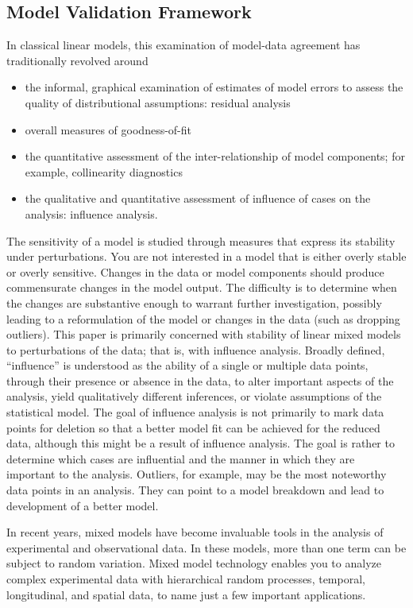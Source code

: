 \documentclass[Main.tex]{subfiles}
\begin{document}
	\subsection*{Model Validation Framework}
	In classical linear models, this examination of model-data agreement has traditionally revolved around
	\begin{itemize}
	\item the informal, graphical examination of estimates of model errors to assess the quality of distributional
	assumptions: residual analysis
	
	\item  overall measures of goodness-of-fit
	\item the quantitative assessment of the inter-relationship of model components; for example, collinearity
	diagnostics
	\item the qualitative and quantitative assessment of influence of cases on the analysis: influence analysis.
\end{itemize}
	The sensitivity of a model is studied through measures that express its stability under perturbations. You
	are not interested in a model that is either overly stable or overly sensitive. Changes in the data or model
	components should produce commensurate changes in the model output. The difficulty is to determine
	when the changes are substantive enough to warrant further investigation, possibly leading to a reformulation
	of the model or changes in the data (such as dropping outliers). This paper is primarily concerned
	with stability of linear mixed models to perturbations of the data; that is, with influence analysis. Broadly
	defined, “influence” is understood as the ability of a single or multiple data points, through their presence
	or absence in the data, to alter important aspects of the analysis, yield qualitatively different inferences, or
	violate assumptions of the statistical model. The goal of influence analysis is not primarily to mark data
	points for deletion so that a better model fit can be achieved for the reduced data, although this might be a
	result of influence analysis. The goal is rather to determine which cases are influential and the manner in
	which they are important to the analysis. Outliers, for example, may be the most noteworthy data points in
	an analysis. They can point to a model breakdown and lead to development of a better model.
	
	
	
	
	In recent years, mixed models have become invaluable tools in the analysis of experimental and observational
	data. In these models, more than one term can be subject to random variation. Mixed model
	technology enables you to analyze complex experimental data with hierarchical random processes, temporal,
	longitudinal, and spatial data, to name just a few important applications. 
	
\end{document}
